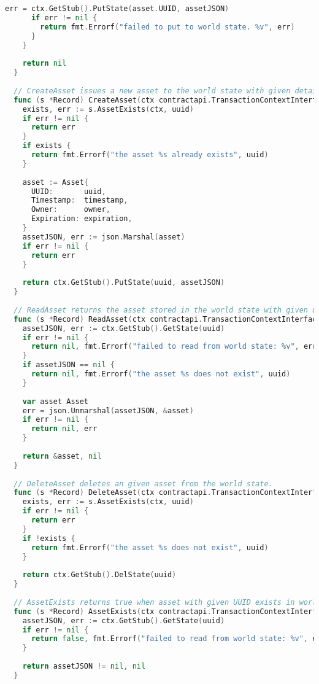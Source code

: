\begin{lstlisting}[language=Go, caption={Chaincode representing immunisation records.}]
      err = ctx.GetStub().PutState(asset.UUID, assetJSON)
      if err != nil {
        return fmt.Errorf("failed to put to world state. %v", err)
      }
    }
  
    return nil
  }
  
  // CreateAsset issues a new asset to the world state with given details.
  func (s *Record) CreateAsset(ctx contractapi.TransactionContextInterface, uuid string, timestamp string, owner string, expiration string) error {
    exists, err := s.AssetExists(ctx, uuid)
    if err != nil {
      return err
    }
    if exists {
      return fmt.Errorf("the asset %s already exists", uuid)
    }
  
    asset := Asset{
      UUID:       uuid,
      Timestamp:  timestamp,
      Owner:      owner,
      Expiration: expiration,
    }
    assetJSON, err := json.Marshal(asset)
    if err != nil {
      return err
    }
  
    return ctx.GetStub().PutState(uuid, assetJSON)
  }
  
  // ReadAsset returns the asset stored in the world state with given uuid.
  func (s *Record) ReadAsset(ctx contractapi.TransactionContextInterface, uuid string) (*Asset, error) {
    assetJSON, err := ctx.GetStub().GetState(uuid)
    if err != nil {
      return nil, fmt.Errorf("failed to read from world state: %v", err)
    }
    if assetJSON == nil {
      return nil, fmt.Errorf("the asset %s does not exist", uuid)
    }
  
    var asset Asset
    err = json.Unmarshal(assetJSON, &asset)
    if err != nil {
      return nil, err
    }
  
    return &asset, nil
  }
  
  // DeleteAsset deletes an given asset from the world state.
  func (s *Record) DeleteAsset(ctx contractapi.TransactionContextInterface, uuid string) error {
    exists, err := s.AssetExists(ctx, uuid)
    if err != nil {
      return err
    }
    if !exists {
      return fmt.Errorf("the asset %s does not exist", uuid)
    }
  
    return ctx.GetStub().DelState(uuid)
  }
  
  // AssetExists returns true when asset with given UUID exists in world state
  func (s *Record) AssetExists(ctx contractapi.TransactionContextInterface, uuid string) (bool, error) {
    assetJSON, err := ctx.GetStub().GetState(uuid)
    if err != nil {
      return false, fmt.Errorf("failed to read from world state: %v", err)
    }
  
    return assetJSON != nil, nil
  }
  

\end{lstlisting}
